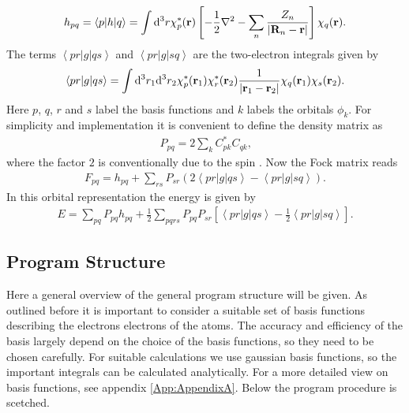 \documentclass[twoside,        %
			   12pt,			%
               BCOR10mm,       %
               ngerman,english  %
               ]{scrartcl}
\begin{document}
\begin{align*}
h_{pq} = \left< p|h|q\right> = \int \mathrm{d}^3 r \chi_p^*(\mathbf{r})\left[ -\frac{1}{2} \nabla^2 - \sum\limits_n \frac{Z_n}{\left| \mathbf{R}_n -\mathbf{r} \right|} \right]\chi_q(\mathbf{r})\text{.}
\end{align*} The terms $\left<pr|g|qs\right>$ and $\left<pr|g|sq\right>$ are the two-electron integrals given by
\begin{align*}
\left<pr|g|qs\right> = \int \mathrm{d}^3 r_1 \mathrm{d}^3 r_2 \chi_p^*(\mathbf{r}_1) \chi_r^*(\mathbf{r}_2) \frac{1}{\left| \mathbf{r}_1 -\mathbf{r}_2 \right|} \chi_q(\mathbf{r}_1) \chi_s(\mathbf{r}_2) \text{.}
\end{align*} Here $p$, $q$, $r$ and $s$ label the basis functions and $k$ labels the orbitals $\phi_k$.
For simplicity and implementation it is convenient to define the density matrix as
\begin{align*}
P_{pq} = 2\sum\limits_k C_{pk}^* C_{qk} \text{,}
\end{align*} where the factor $2$ is conventionally due to the spin \cite{Thijssen2007}.
Now the Fock matrix reads
\begin{align*}
F_{pq} = h_{pq} + \sum\limits_{rs} P_{sr} \left( 2 \left<pr|g|qs\right> -  \left<pr|g|sq\right> \right)\text{.}
\end{align*} In this orbital representation the energy is given by
\begin{align*}
E = \sum\limits_{pq} P_{pq}h_{pq} + \frac{1}{2}  \sum\limits_{pqrs} P_{pq}P_{sr} \left[ \left<pr|g|qs\right> -  \frac{1}{2}\left<pr|g|sq\right> \right] \text{.}
\end{align*}
    
\subsection{Program Structure}
Here a general overview of the general program structure will be given.
As outlined before it is important to consider a suitable set of basis functions describing the electrons electrons of the atoms. The accuracy and efficiency of the basis largely depend on the choice of the basis functions, so they need to be chosen carefully. For suitable calculations we use gaussian basis functions, so the important integrals can be calculated analytically. For a more detailed view on basis functions, see appendix \ref{App:AppendixA}.
Below the program procedure is scetched.
\end{document}

